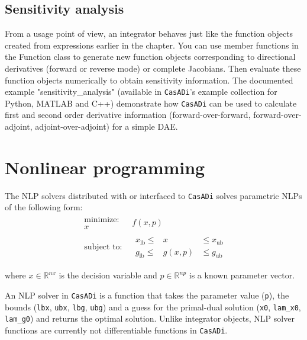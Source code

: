 \documentclass[a4paper,12pt]{book}
\newcommand{\CasADi}{\texttt{CasADi}\xspace}
\newcommand{\lb}{\text{lb}}
\newcommand{\ub}{\text{ub}}
\begin{document}
\subsection{Sensitivity analysis}
From a usage point of view, an integrator behaves just like the function objects created from expressions earlier in the chapter.
You can use member functions in the Function class to generate new function objects corresponding to directional derivatives (forward or reverse mode) or complete Jacobians. Then evaluate these function objects numerically to obtain sensitivity information. The documented example "sensitivity\_analysis" (available in \CasADi's example collection for Python, MATLAB and C++) demonstrate how \CasADi can be used to calculate first and second order derivative information (forward-over-forward, forward-over-adjoint, adjoint-over-adjoint) for a simple DAE.

\section{Nonlinear programming} \label{sec:nlpsol}
The NLP solvers distributed with or interfaced to \CasADi solves parametric NLPs of the following form:
\begin{equation} \label{eq:nlp}
\begin{array}{cc}
\begin{array}{c}
\text{minimize:} \\
x
\end{array}
&
f(x,p)
\\
\begin{array}{c}
\text{subject to:}
\end{array}
&
\begin{array}{rcl}
  x_{\lb} \le &  x   & \le x_{\ub} \\
  g_{\lb} \le &g(x,p)& \le g_{\ub}
\end{array}
\end{array}
\end{equation}

where $x \in \mathbb{R}^{nx}$ is the decision variable and $p \in \mathbb{R}^{np}$ is a known parameter vector.

An NLP solver in \CasADi is a function that takes the parameter value (\texttt{p}), the bounds (\texttt{lbx}, \texttt{ubx}, \texttt{lbg}, \texttt{ubg}) and a guess for the primal-dual solution (\texttt{x0}, \texttt{lam\_x0}, \texttt{lam\_g0}) and returns the optimal solution. Unlike integrator objects, NLP solver functions are currently not differentiable functions in \CasADi.
\end{document}
